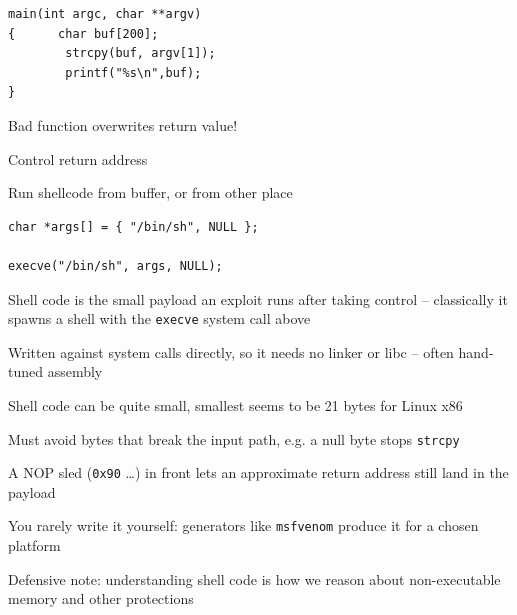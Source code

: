 \documentclass[Screen16to9,17pt]{foils}
\begin{document}


\begin{verbatim}
main(int argc, char **argv)
{      char buf[200];
        strcpy(buf, argv[1]);
        printf("%s\n",buf);
}
\end{verbatim}






\begin{list2}
\item Bad function overwrites return value!
\item Control return address
\item Run shellcode from buffer, or from other place
\end{list2}



\begin{verbatim}
char *args[] = { "/bin/sh", NULL };

execve("/bin/sh", args, NULL);
\end{verbatim}


\begin{list2}
\item Shell code is the small payload an exploit runs after taking control -- classically it spawns a shell with the \verb+execve+ system call above
\item Written against system calls directly, so it needs no linker or libc -- often hand-tuned assembly
\item Shell code can be quite small, smallest seems to be 21 bytes for Linux x86
\item Must avoid bytes that break the input path, e.g. a null byte stops \verb+strcpy+
\item A NOP sled (\verb+0x90+ \dots) in front lets an approximate return address still land in the payload
\item You rarely write it yourself: generators like \verb+msfvenom+ produce it for a chosen platform
\end{list2}

Defensive note: understanding shell code is how we reason about non-executable memory and other protections


\end{document}
